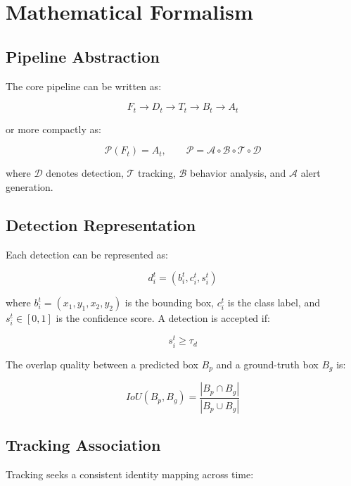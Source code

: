 \documentclass[11pt]{article}
\begin{document}
\section{Mathematical Formalism}

\subsection{Pipeline Abstraction}
The core pipeline can be written as:

\begin{equation}
F_t \rightarrow D_t \rightarrow T_t \rightarrow B_t \rightarrow A_t
\end{equation}

or more compactly as:

\begin{equation}
\mathcal{P}(F_t) = A_t, \qquad \mathcal{P} = \mathcal{A} \circ \mathcal{B} \circ \mathcal{T} \circ \mathcal{D}
\end{equation}

where $\mathcal{D}$ denotes detection, $\mathcal{T}$ tracking, $\mathcal{B}$ behavior analysis, and $\mathcal{A}$ alert generation.

\subsection{Detection Representation}
Each detection can be represented as:

\begin{equation}
d_i^t = \left(b_i^t, c_i^t, s_i^t\right)
\end{equation}

where $b_i^t = (x_1, y_1, x_2, y_2)$ is the bounding box, $c_i^t$ is the class label, and $s_i^t \in [0,1]$ is the confidence score. A detection is accepted if:

\begin{equation}
s_i^t \geq \tau_d
\end{equation}

The overlap quality between a predicted box $B_p$ and a ground-truth box $B_g$ is:

\begin{equation}
IoU(B_p, B_g) = \frac{|B_p \cap B_g|}{|B_p \cup B_g|}
\end{equation}

\subsection{Tracking Association}
Tracking seeks a consistent identity mapping across time:
\end{document}
